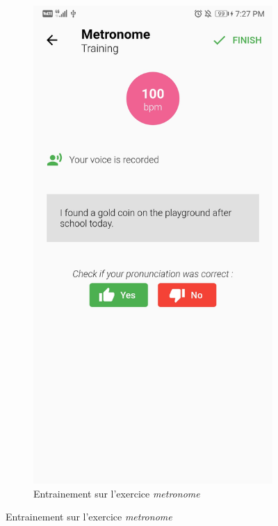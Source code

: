 \begin{appendices}
\begin{landscape}
\begin{figure}[h]
\begin{subfigure}{.25\textwidth}
    \includegraphics[width=.75\linewidth]{content/imgs/screen4.jpg}
    \caption{Entrainement sur l'exercice \textit{metronome}}
  \end{subfigure}
\end{figure}



\end{landscape}
\end{appendices}
